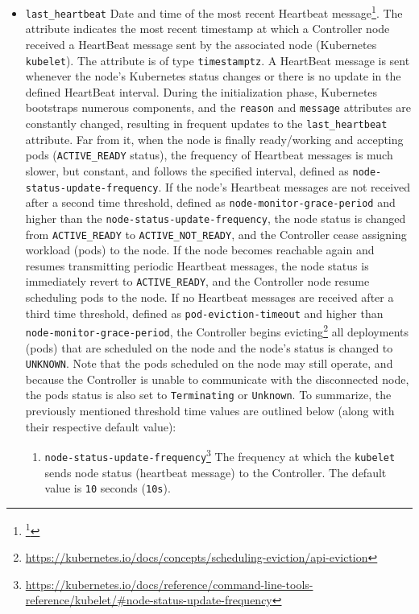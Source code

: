 \begin{itemize}
  \item \texttt{last\_heartbeat}
    \newline
    Date and time of the most recent Heartbeat message\footnote{\footnote{\url{https://kubernetes.io/docs/concepts/architecture/nodes/\#heartbeats}}}.
    \newline
    The attribute indicates the most recent timestamp at which a Controller node
    received a HeartBeat message sent by the associated node (Kubernetes \texttt{kubelet}).
    The attribute is of type \texttt{timestamptz}.
    \newline
    A HeartBeat message is sent whenever the node's Kubernetes status changes or
    there is no update in the defined HeartBeat interval. During the initialization
    phase, Kubernetes bootstraps numerous components, and the \texttt{reason}
    and \texttt{message} attributes are constantly changed, resulting in
    frequent updates to the \texttt{last\_heartbeat} attribute. Far from it, when
    the node is finally ready/working and accepting pods (\texttt{ACTIVE\_READY}
    status), the frequency of Heartbeat messages is much slower, but constant, and
    follows the specified interval, defined as \texttt{node-status-update-frequency}.
    If the node's Heartbeat messages are not received after a second time
    threshold, defined as \texttt{node-monitor-grace-period} and higher than the
    \texttt{node-status-update-frequency}, the node status is changed from
    \texttt{ACTIVE\_READY} to \texttt{ACTIVE\_NOT\_READY}, and the Controller cease
    assigning workload (pods) to the node. If the node becomes reachable again
    and resumes transmitting periodic Heartbeat messages, the node status is immediately
    revert to \texttt{ACTIVE\_READY}, and the Controller node resume scheduling pods
    to the node. If no Heartbeat messages are received after a third time
    threshold, defined as \texttt{pod-eviction-timeout} and higher than \texttt{node-monitor-grace-period},
    the Controller begins evicting\footnote{\url{https://kubernetes.io/docs/concepts/scheduling-eviction/api-eviction}}
    all deployments (pods) that are scheduled on the node and the node's status
    is changed to \texttt{UNKNOWN}. Note that the pods scheduled on the node may
    still operate, and because the Controller is unable to communicate with the disconnected
    node, the pods status is also set to \texttt{Terminating} or \texttt{Unknown}.
    \newline
    To summarize, the previously mentioned threshold time values are outlined
    below (along with their respective default value):
    \begin{enumerate}
      \item \texttt{node-status-update-frequency}\footnote{\url{https://kubernetes.io/docs/reference/command-line-tools-reference/kubelet/\#node-status-update-frequency}}
        \newline
        The frequency at which the \texttt{kubelet} sends node status (heartbeat
        message) to the Controller.
        \newline
        The default value is \texttt{10} seconds (\texttt{10s}).


\end{enumerate}
\end{itemize}
